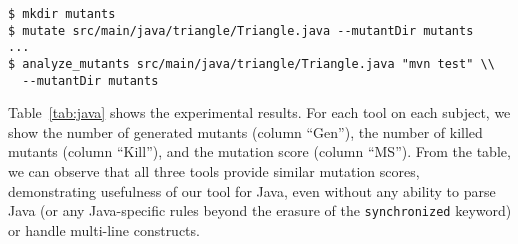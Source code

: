 {\scriptsize
\begin{verbatim}
$ mkdir mutants
$ mutate src/main/java/triangle/Triangle.java --mutantDir mutants
...
$ analyze_mutants src/main/java/triangle/Triangle.java "mvn test" \\
  --mutantDir mutants
\end{verbatim}
} Table~\ref{tab:java} shows the experimental results. For each
tool on each subject, we show the number of generated mutants
(column ``Gen''), the number of killed mutants (column ``Kill''), and
the mutation score (column ``MS''). From the table, we can observe that all three tools provide similar mutation scores, demonstrating usefulness of our tool for Java, even without any ability to parse Java (or any Java-specific rules beyond the erasure of the {\tt synchronized} keyword) or handle multi-line constructs.


